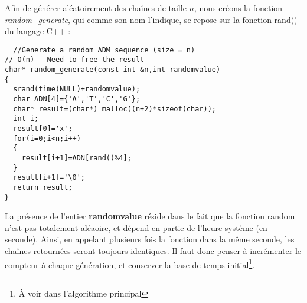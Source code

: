 Afin de générer aléatoirement des chaînes de taille $n$, nous créons la fonction \textit{random\_generate}, qui comme son nom l'indique, se repose sur la fonction rand() du langage C++ :

\begin{center}
\begin{minipage}{0.9\textwidth}
\begin{center}
\begin{lstlisting}
  //Generate a random ADM sequence (size = n)
// O(n) - Need to free the result
char* random_generate(const int &n,int randomvalue)
{
  srand(time(NULL)+randomvalue);
  char ADN[4]={'A','T','C','G'};
  char* result=(char*) malloc((n+2)*sizeof(char));
  int i;
  result[0]='x';
  for(i=0;i<n;i++)
  {
    result[i+1]=ADN[rand()%4];
  }
  result[i+1]='\0';
  return result;
}
\end{lstlisting}
\end{center}
\end{minipage} 
\end{center}

La présence de l'entier \textbf{randomvalue} réside dans le fait que la fonction random n'est pas totalement aléaoire, et dépend en partie de l'heure système (en seconde).
Ainsi, en appelant plusieurs fois la fonction dans la même seconde, les chaînes retournées seront toujours identiques. Il faut donc penser à incrémenter le compteur à chaque génération, et conserver la base de temps initial\footnote{À voir dans l'algorithme principal}.
